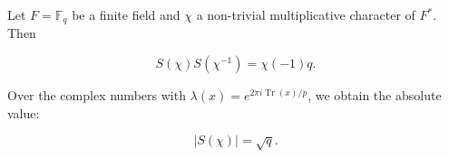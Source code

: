 Let $F = \mathbb{F}_q$ be a finite field and $\chi$ a non-trivial multiplicative character of $F^*$. Then

$$S(\chi) S(\chi^{-1}) = \chi(-1) q.$$

Over the complex numbers with $\lambda(x) = e^{2\pi i \operatorname{Tr}(x)/p}$, we obtain the absolute value:

$$|S(\chi)| = \sqrt{q}.$$
